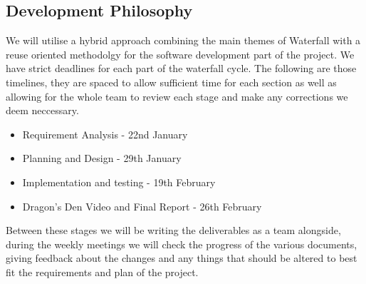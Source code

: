 \documentclass{article}
\begin{document}
\subsection{Development Philosophy}
We will utilise a hybrid approach combining the main themes of Waterfall with a 
reuse oriented methodolgy for the software development part of the project. We 
have strict deadlines for each part of the waterfall cycle. The following are 
those timelines, they are spaced to allow sufficient time for each section as 
well as allowing for the whole team to review each stage and make any corrections 
we deem neccessary. 

\begin{itemize}
  \item Requirement Analysis
        - 22nd January
  \item Planning and Design
        - 29th January
  \item Implementation and testing
        - 19th February
  \item Dragon's Den Video and Final Report
        - 26th February
\end{itemize}

Between these stages we will be writing the deliverables as a team alongside,
during the weekly meetings we will check the progress of the various documents,
giving feedback about the changes and any things that should be altered to best 
fit the requirements and plan of the project.
\end{document}
